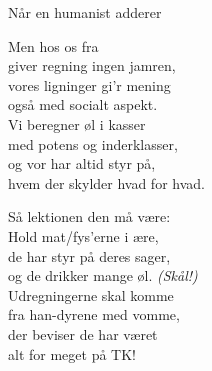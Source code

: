 \begin{song}{Når en humanist adderer}
  \begin{SBVerse}
    Men hos os fra \TKET{}\\
    giver regning ingen jamren,\\
    vores ligninger gi’r mening\\
    også med socialt aspekt.\\
    \medskip
    Vi beregner øl i kasser\\
    med potens og inderklasser,\\
    og vor \KASS har altid styr på,\\
    hvem der skylder hvad for hvad.
  \end{SBVerse}

  \begin{SBVerse}
    Så lektionen den må være:\\
    Hold mat/fys’erne i ære,\\
    de har styr på deres sager,\\
    og de drikker mange øl. \emph{(Skål!)}\\
    \medskip
    Udregningerne skal komme\\
    fra han-dyrene med vomme,\\
    der beviser de har været\\
    alt for meget på TK!
  \end{SBVerse}
\end{song}